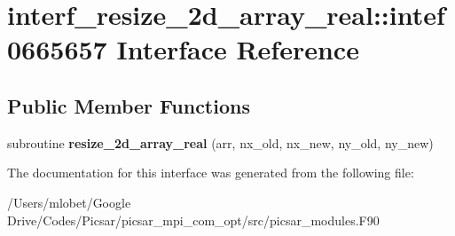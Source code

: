 \hypertarget{interfaceinterf__resize__2d__array__real_1_1intef0665657}{}\section{interf\+\_\+resize\+\_\+2d\+\_\+array\+\_\+real\+:\+:intef0665657 Interface Reference}
\label{interfaceinterf__resize__2d__array__real_1_1intef0665657}
\subsection*{Public Member Functions}
\begin{DoxyCompactItemize}
\item 
subroutine {\bfseries resize\+\_\+2d\+\_\+array\+\_\+real} (arr, nx\+\_\+old, nx\+\_\+new, ny\+\_\+old, ny\+\_\+new)\hypertarget{interfaceinterf__resize__2d__array__real_1_1intef0665657_afe517ab21512b3a73d4477ca2abbd5c2}{}\label{interfaceinterf__resize__2d__array__real_1_1intef0665657_afe517ab21512b3a73d4477ca2abbd5c2}

\end{DoxyCompactItemize}


The documentation for this interface was generated from the following file\+:\begin{DoxyCompactItemize}
\item 
/\+Users/mlobet/\+Google Drive/\+Codes/\+Picsar/picsar\+\_\+mpi\+\_\+com\+\_\+opt/src/picsar\+\_\+modules.\+F90\end{DoxyCompactItemize}

